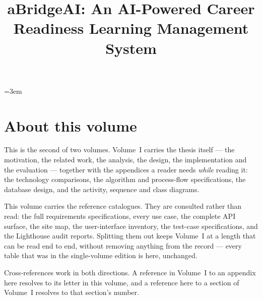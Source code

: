 \documentclass[twoside,final]{hcmut-report}
\title{aBridgeAI: An AI-Powered Career Readiness Learning Management System}
\begin{document}
\emergencystretch=3em
\coverpage%

\pagestyle{plain}
\setcounter{page}{1}

\section*{About this volume}

This is the second of two volumes. Volume~I carries the thesis itself --- the
motivation, the related work, the analysis, the design, the implementation and
the evaluation --- together with the appendices a reader needs \emph{while}
reading it: the technology comparisons, the algorithm and process-flow
specifications, the database design, and the activity, sequence and class
diagrams.

This volume carries the reference catalogues. They are consulted rather than
read: the full requirements specifications, every use case, the complete API
surface, the site map, the user-interface inventory, the test-case
specifications, and the Lighthouse audit reports. Splitting them out keeps
Volume~I at a length that can be read end to end, without removing anything
from the record --- every table that was in the single-volume edition is here,
unchanged.

Cross-references work in both directions. A reference in Volume~I to an
appendix here resolves to its letter in this volume, and a reference here to a
section of Volume~I resolves to that section's number.

\clearpage
\tableofcontents
\clearpage
\listoftables
\clearpage
\listoffigures

\clearpage
\pagestyle{fancy}
\setcounter{page}{1}


\end{document}
